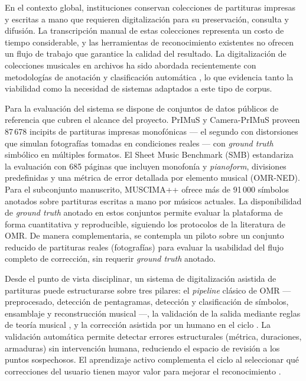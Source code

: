En el contexto global, instituciones conservan colecciones de partituras
impresas y escritas a mano que requieren digitalizaci\'on para su
preservaci\'on, consulta y difusi\'on. La transcripci\'on manual de estas
colecciones representa un costo de tiempo considerable, y las herramientas
de reconocimiento existentes no ofrecen un flujo de trabajo que garantice
la calidad del resultado. La digitalizaci\'on de colecciones musicales en
archivos ha sido abordada recientemente con metodolog\'ias de anotaci\'on y
clasificaci\'on autom\'atica \cite{ricordi2024}, lo que evidencia tanto la
viabilidad como la necesidad de sistemas adaptados a este tipo de corpus.

Para la evaluaci\'on del sistema se dispone de conjuntos de datos
p\'ublicos de referencia que cubren el alcance del proyecto. PrIMuS y
Camera-PrIMuS \cite{calvo2018} proveen 87\,678 incipits de partituras
impresas monof\'onicas --- el segundo con distorsiones que simulan
fotograf\'ias tomadas en condiciones reales --- con \emph{ground truth}
simb\'olico en m\'ultiples formatos. El Sheet Music Benchmark (SMB)
\cite{smb2026} estandariza la evaluaci\'on con 685 p\'aginas que incluyen
monofon\'ia y \emph{pianoform}, divisiones predefinidas y una m\'etrica de
error detallada por elemento musical (OMR-NED). Para el subconjunto
manuscrito, MUSCIMA++ \cite{muscima2017} ofrece m\'as de 91\,000 s\'imbolos
anotados sobre partituras escritas a mano por m\'usicos actuales. La
disponibilidad de \emph{ground truth} anotado en estos conjuntos permite
evaluar la plataforma de forma cuantitativa y reproducible, siguiendo los
protocolos de la literatura de OMR. De manera complementaria, se contempla
un piloto sobre un conjunto reducido de partituras reales (fotograf\'ias)
para evaluar la usabilidad del flujo completo de correcci\'on, sin requerir
\emph{ground truth} anotado.

Desde el punto de vista disciplinar, un sistema de digitalizaci\'on
asistida de partituras puede estructurarse sobre tres pilares: el
\emph{pipeline} cl\'asico de OMR --- preprocesado, detecci\'on de
pentagramas, detecci\'on y clasificaci\'on de s\'imbolos, ensamblaje y
reconstrucci\'on musical \cite{omr2020} ---, la validaci\'on de la salida
mediante reglas de teor\'ia musical \cite{cuthbert2010}, y la correcci\'on
asistida por un humano en el ciclo \cite{amershi2014}. La validaci\'on
autom\'atica permite detectar errores estructurales (m\'etrica, duraciones,
armaduras) sin intervenci\'on humana, reduciendo el espacio de revisi\'on a
los puntos sospechosos. El aprendizaje activo complementa el ciclo al
seleccionar qu\'e correcciones del usuario tienen mayor valor para mejorar
el reconocimiento \cite{settles2009}.

